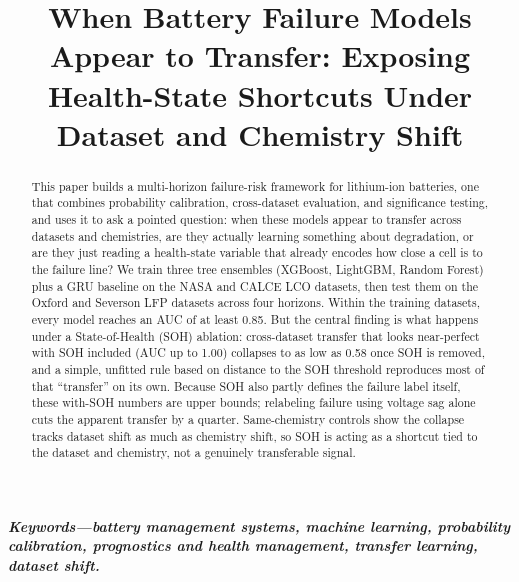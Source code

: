 \documentclass[conference]{IEEEtran}
\begin{document}
\title{When Battery Failure Models Appear to Transfer: Exposing Health-State Shortcuts Under Dataset and Chemistry Shift}

\maketitle

\begin{abstract}
This paper builds a multi-horizon failure-risk framework for
lithium-ion batteries, one that combines probability calibration,
cross-dataset evaluation, and significance testing, and uses it to ask
a pointed question: when these models appear to transfer across
datasets and chemistries, are they actually learning something about
degradation, or are they just reading a health-state variable that
already encodes how close a cell is to the failure line? We train
three tree ensembles (XGBoost, LightGBM, Random Forest) plus a GRU
baseline on the NASA and CALCE LCO datasets, then test them on the
Oxford and Severson LFP datasets across four horizons. Within the
training datasets, every model reaches an AUC of at least 0.85. But
the central finding is what happens under a State-of-Health (SOH)
ablation: cross-dataset transfer that looks near-perfect with SOH
included (AUC up to 1.00) collapses to as low as 0.58 once SOH is
removed, and a simple, unfitted rule based on distance to the SOH
threshold reproduces most of that ``transfer'' on its own. Because SOH
also partly defines the failure label itself, these with-SOH numbers
are upper bounds; relabeling failure using voltage sag alone cuts the
apparent transfer by a quarter. Same-chemistry controls show the
collapse tracks dataset shift as much as chemistry shift, so SOH is
acting as a shortcut tied to the dataset and chemistry, not a
genuinely transferable signal.
\end{abstract}

\noindent\textbf{\textit{Keywords---battery management
systems, machine learning, probability calibration, prognostics and
health management, transfer learning, dataset shift.}}
\end{document}
